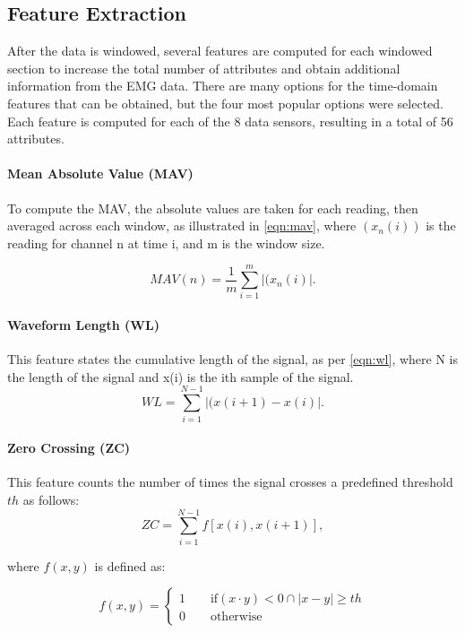 \documentclass[journal]{IEEEtran}
\begin{document}
\subsection{Feature Extraction}
After the data is windowed, several features are computed for each windowed section to increase the total number of attributes and obtain additional information from the EMG data. There are many options for the time-domain features that can be obtained, but the four most popular options were selected. Each feature is computed for each of the 8 data sensors, resulting in a total of 56 attributes.

\paragraph{Mean Absolute Value (MAV)} 
To compute the MAV, the absolute values are taken for each reading, then averaged across each window, as illustrated in \cref{eqn:mav}, where $(x_n(i))$ is the reading for channel n at time i, and m is the window size.

\begin{equation}
MAV(n) = \frac{1}{m}\sum_{i=1}^{m}\left|(x_n(i)\right|.
\label{eqn:mav}
\end{equation}

\paragraph{Waveform Length (WL)} 
This feature states the cumulative length of the signal, as per \cref{eqn:wl}, where N is the length of the signal and x(i) is the ith sample of the signal.
\begin{equation}
WL = \sum_{i=1}^{N-1}\left|(x(i+1) - x(i)\right|.
\label{eqn:wl}
\end{equation}

\paragraph{Zero Crossing (ZC)}
This feature counts the number of times the signal crosses a predefined threshold $th$ as follows:
\begin{equation}
ZC=\sum_{i=1}^{N-1}f\left[x\left(i\right),x\left(i+1\right)\right],
\label{eqn:zc}
\end{equation}

\noindent where $f(x,y)$ is defined as:

\begin{equation}
f(x,y)=\begin{cases}
1\qquad\text{if}(x\cdot{y})< 0\cap\left|x-y\right|\geq th\\
0\qquad\text{otherwise}
\end{cases}
\label{eqn:zc2}
\end{equation}
\end{document}
